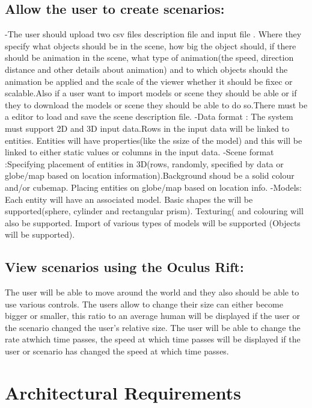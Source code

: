 \documentclass[a4paper,12pt]{article}
\begin{document}
\subsection{Allow the user to create scenarios:}
-The user should upload two csv files description file and input file . Where they specify what objects should be in the scene, how big the object should, if there should be animation in the scene, what type of animation(the speed, direction distance and other details about animation) and to which objects should the animation be applied and the scale of the viewer whether it should be fixec or scalable.Also if a user want to import models or scene they should be able or if they to download the models or scene they should be able to do so.There must be a editor to load and save the scene description file.
-Data format : The system must support 2D and 3D input data.Rows in the input data will be linked to entities. Entities will have properties(like the ssize of the model) and this will be linked to either static values or columns in the input data.
-Scene format :Specifying placement of entities in 3D(rows, randomly, specified by data or globe/map based on location information).Background shoud be a solid colour and/or cubemap.
Placing entities on globe/map based on location info. 
-Models: Each entity will have an associated model. Basic shapes the will be supported(sphere, cylinder and rectangular prism). Texturing( and colouring will also be supported. Import of various types of models will be supported (Objects will be supported).
\subsection{View scenarios using the Oculus Rift:}
The user will be able to move around the world and they also should be able to use various controls. The users  allow to change their size can either become bigger or smaller, this ratio to an average human will be displayed if the user or the scenario changed the user's relative size. The user will be able to change the rate atwhich time passes, the speed at which time passes will be displayed if the user or scenario has changed the speed at which time passes.


\newpage
\section{Architectural Requirements}	%
\end{document}

